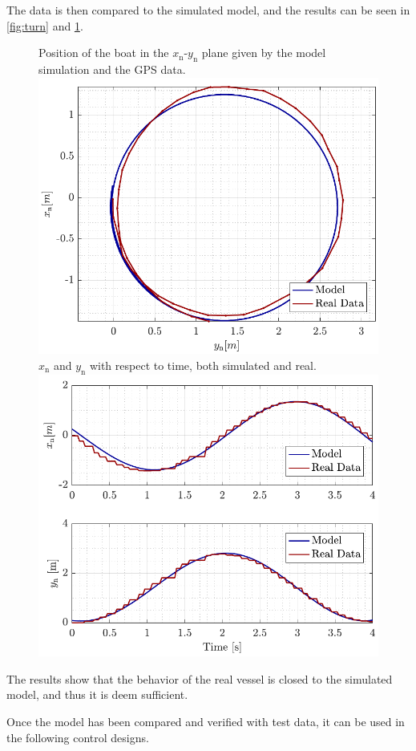 The data is then compared to the simulated model, and the results can be seen in \autoref{fig:turn} and \ref{fig:turn_time}.

\begin{figure}[H]
    \captionbox 
    {   
        Position of the boat in the $x_\mathrm{n}$-$y_\mathrm{n}$ plane given by the model simulation and the GPS data.
        \label{fig:turn}
    }                                                                 
    {                                                                  
        \includegraphics[width=.45\textwidth]{figures/turn}         
    }                                                                    
    \hspace{5pt}                                                          
    \captionbox  
    {      
        $x_\mathrm{n}$ and $y_\mathrm{n}$ with respect to time, both simulated and real.
        \label{fig:turn_time}
    }                                                                        
    {
        \includegraphics[width=.45\textwidth]{figures/turn_time}
    }
\end{figure}

The results show that the behavior of the real vessel is closed to the simulated model, and thus it is deem sufficient.

Once the model has been compared and verified with test data, it can be used in the following control designs.